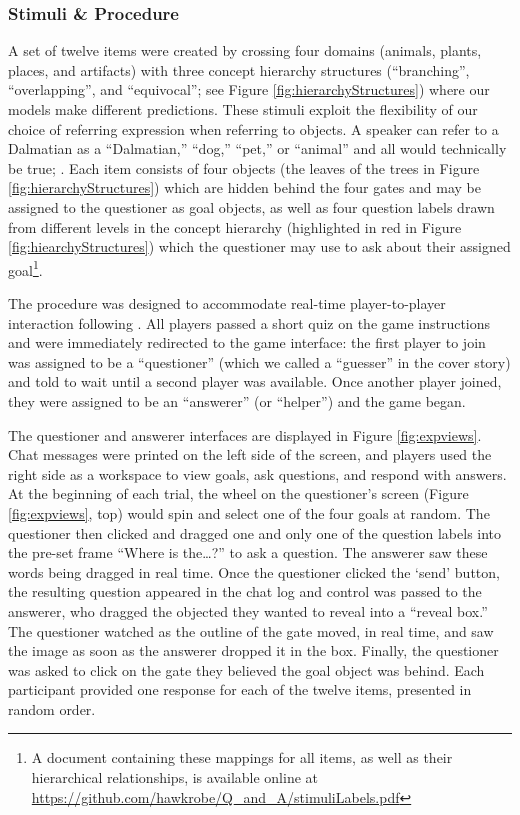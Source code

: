 \documentclass[12pt, floatsintext, jou]{apa6}
\begin{document}
\subsubsection{Stimuli \& Procedure} A set of twelve items were created by crossing four domains (animals, plants, places, and artifacts) with three concept hierarchy structures (``branching'', ``overlapping'', and ``equivocal''; see Figure \ref{fig:hierarchyStructures}) where our models make different predictions. These stimuli exploit the flexibility of our choice of referring expression when referring to objects. A speaker can refer to a Dalmatian as a ``Dalmatian,'' ``dog,'' ``pet,'' or ``animal'' and all would technically be true; . Each item consists of four objects (the leaves of the trees in Figure \ref{fig:hierarchyStructures}) which are hidden behind the four gates and may be assigned to the questioner as goal objects, as well as four question labels drawn from different levels in the concept hierarchy (highlighted in red in Figure \ref{fig:hiearchyStructures}) which the questioner may use to ask about their assigned goal\footnote{A document containing these mappings for all items, as well as their hierarchical relationships, is available online at \scriptsize\url{https://github.com/hawkrobe/Q\_and\_A/stimuliLabels.pdf}}.

The procedure was designed to accommodate real-time player-to-player interaction following . All players passed a short quiz on the game instructions and were immediately redirected to the game interface: the first player to join was assigned to be a ``questioner'' (which we called a ``guesser'' in the cover story) and told to wait until a second player was available. Once another player joined, they were assigned to be an ``answerer'' (or ``helper'') and the game began. 

The questioner and answerer interfaces are displayed in Figure \ref{fig:expviews}. Chat messages were printed on the left side of the screen, and players used the right side as a workspace to view goals, ask questions, and respond with answers. At the beginning of each trial, the wheel on the questioner's screen (Figure \ref{fig:expviews}, top) would spin and select one of the four goals at random. The questioner then clicked and dragged one and only one of the question labels into the pre-set frame ``Where is the\dots?'' to ask a question. The answerer saw these words being dragged in real time. Once the questioner clicked the `send' button, the resulting question appeared in the chat log and control was passed to the answerer, who dragged the objected they wanted to reveal into a ``reveal box.'' The questioner watched as the outline of the gate moved, in real time, and saw the image as soon as the answerer dropped it in the box. Finally, the questioner was asked to click on the gate they believed the goal object was behind. Each participant provided one response for each of the twelve items, presented in random order. 
\end{document}
